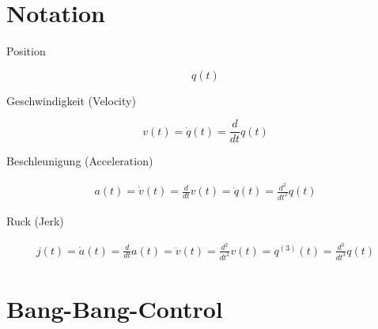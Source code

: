 \section{Notation}
{ 


  Position

  \begin{equation}
    q(t)
  \end{equation}

  Geschwindigkeit (Velocity)

  \begin{equation}
    v(t) 
    = \dot{q}(t) 
    = \frac{d}{dt} q(t)
  \end{equation}

  Beschleunigung (Acceleration)

  \begin{eqnarray}
    a(t) 
    = \dot{v}(t) = \frac{d}{dt} v(t) 
    = \ddot{q}(t) = \frac{d^2}{dt^2} q(t)
  \end{eqnarray}

  Ruck (Jerk)

  \begin{eqnarray}
    j(t) 
    = \dot{a}(t) = \frac{d}{dt} a(t)
    = \ddot{v}(t) = \frac{d^2}{dt^2} v(t)
    = q^{(3)}(t) = \frac{d^3}{dt^3} q(t)
  \end{eqnarray}
}


\section{Bang-Bang-Control}


